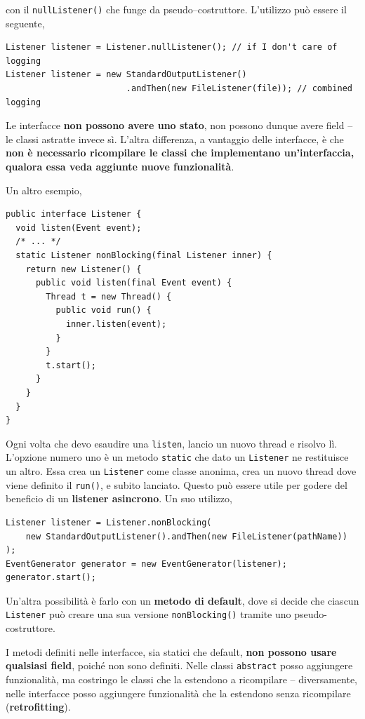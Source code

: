 \documentclass[\fontsizeclass,twocolumn]{\classname}
\theoremstyle{definition}
\theoremstyle{definition}
\begin{document}
con il \texttt{nullListener()} che funge da pseudo--costruttore. L'utilizzo può essere il seguente,

\begin{lstlisting}
Listener listener = Listener.nullListener(); // if I don't care of logging
Listener listener = new StandardOutputListener()
                        .andThen(new FileListener(file)); // combined logging
\end{lstlisting}

Le interfacce \textbf{non possono avere uno stato}, non possono dunque avere
field -- le classi astratte invece sì. L'altra differenza, a vantaggio delle
interfacce, è che \textbf{non è necessario ricompilare le classi che
implementano un'interfaccia, qualora essa veda aggiunte nuove funzionalità}.

Un altro esempio,

\begin{lstlisting}
public interface Listener {
  void listen(Event event);
  /* ... */
  static Listener nonBlocking(final Listener inner) {
    return new Listener() {
      public void listen(final Event event) {
        Thread t = new Thread() {
          public void run() {
            inner.listen(event);
          }
        }
        t.start();
      }
    }
  }
}
\end{lstlisting}

Ogni volta che devo esaudire una \texttt{listen}, lancio un nuovo thread e
risolvo lì. L'opzione numero uno è un metodo \texttt{static} che dato un
\texttt{Listener} ne restituisce un altro. Essa crea un \texttt{Listener} come
classe anonima, crea un nuovo thread dove viene definito il \texttt{run()}, e
subito lanciato. Questo può essere utile per godere del beneficio di un
\textbf{listener asincrono}. Un suo utilizzo,

\begin{lstlisting}
Listener listener = Listener.nonBlocking(
    new StandardOutputListener().andThen(new FileListener(pathName))
);
EventGenerator generator = new EventGenerator(listener);
generator.start();
\end{lstlisting}
Un'altra possibilità è farlo con un \textbf{metodo di default}, dove si decide
che ciascun \texttt{Listener} può creare una sua versione
\texttt{nonBlocking()} tramite uno pseudo\--costruttore.

I metodi definiti nelle interfacce, sia statici che default, \textbf{non
possono usare qualsiasi field}, poiché non sono definiti. Nelle classi
\texttt{abstract} posso aggiungere funzionalità, ma costringo le classi che la
estendono a ricompilare -- diversamente, nelle interfacce posso aggiungere
funzionalità che la estendono senza ricompilare (\textbf{retrofitting}).
\end{document}
